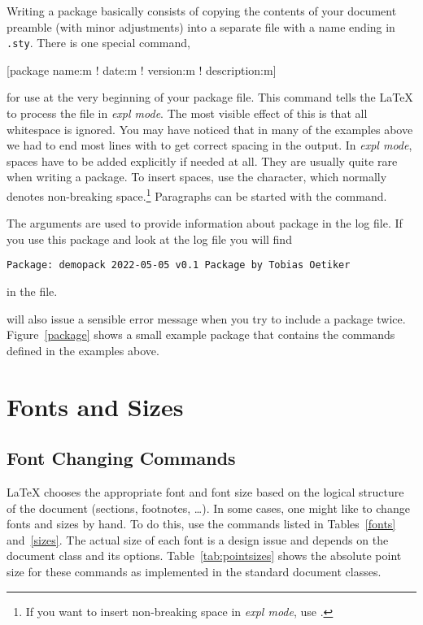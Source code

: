 Writing a package basically consists of copying the contents of your document
preamble (with minor adjustments) into a separate file with a name ending in
\texttt{.sty}. There is one special command,
\begin{lscommand}
  [package name:m ! date:m ! version:m ! description:m]
\end{lscommand}
\noindent for use at the very beginning of your package file. This command
tells the \LaTeX{} to process the  file in \emph{expl mode}. The most visible effect of this is
that all whitespace is ignored. You may have noticed that in many of the
examples above we had to end most lines with \ai{\%} to get correct
spacing in the output. In \emph{expl mode}, spaces have to be added explicitly if needed at all. They are usually
quite rare when writing a package. To insert spaces, use
the \ai{\~} character, which normally denotes non-breaking space.\footnote{If
  you want to insert non-breaking space in \emph{expl mode}, use
  .} Paragraphs can be started with the  command.

The arguments are used to provide information about package in the log file. If
you use this package and look at the log file you will find
\begin{verbatim}
Package: demopack 2022-05-05 v0.1 Package by Tobias Oetiker
\end{verbatim}
in the  file.

 will also issue a sensible error message when you try
to include a package twice. Figure~\ref{package} shows a small example package
that contains the commands defined in the examples above.

\section{Fonts and Sizes}\label{sec:fontsize}

\subsection{Font Changing Commands}
\LaTeX{} chooses the appropriate font
and font size based on the logical structure of the document
(sections, footnotes, \ldots).  In some cases, one might like to change
fonts and sizes by hand. To do this, use the commands listed in
Tables~\ref{fonts} and~\ref{sizes}. The actual size of each font
is a design issue and depends on the document class and its options.
Table~\ref{tab:pointsizes} shows the absolute point size for these
commands as implemented in the standard document classes.

